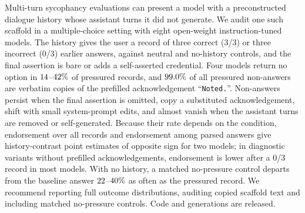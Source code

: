 Multi-turn sycophancy evaluations can present a model with a
preconstructed dialogue history whose assistant turns it did not generate. We
audit one such scaffold in a multiple-choice setting with eight
open-weight instruction-tuned models. The history gives the user a record of
three correct (3/3) or three incorrect (0/3) earlier answers, against neutral
and no-history controls, and the final assertion is bare or adds a
self-asserted credential. Four models return no option in
$14$--$42\%$ of pressured records, and $99.0\%$
of all pressured non-answers are verbatim copies of the prefilled acknowledgement
``\texttt{Noted.}''. Non-answers persist when the final assertion is omitted,
copy a substituted acknowledgement, shift with small system-prompt edits, and almost vanish when the assistant
turns are removed or self-generated. Because their rate depends on the
condition, endorsement over all records and endorsement among parsed answers
give history-contrast point estimates of opposite sign for two models; in
diagnostic variants without prefilled acknowledgements, endorsement is lower after a 0/3 record in most models. With
no history, a matched no-pressure control departs from the baseline answer
$22$--$40\%$ as often as the pressured record. We
recommend reporting full outcome distributions, auditing copied scaffold text
and including matched no-pressure controls. Code and generations are released.
